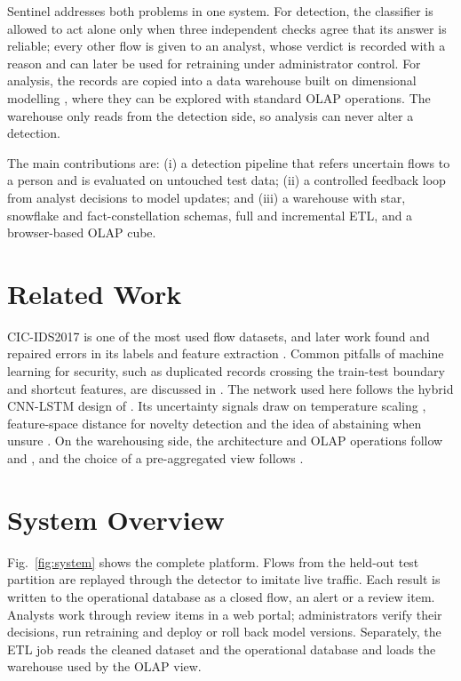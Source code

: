 \documentclass[conference]{IEEEtran}
\begin{document}
Sentinel addresses both problems in one system. For detection, the classifier is allowed to act
alone only when three independent checks agree that its answer is reliable; every other flow is
given to an analyst, whose verdict is recorded with a reason and can later be used for retraining
under administrator control. For analysis, the records are copied into a data warehouse built on
dimensional modelling \cite{inmon2005building,kimball2013toolkit}, where they can be explored with
standard OLAP operations. The warehouse only reads from the detection side, so analysis can never
alter a detection.

The main contributions are: (i) a detection pipeline that refers uncertain flows to a person and
is evaluated on untouched test data; (ii) a controlled feedback loop from analyst decisions to
model updates; and (iii) a warehouse with star, snowflake and fact-constellation schemas, full and
incremental ETL, and a browser-based OLAP cube.

\section{Related Work}
CIC-IDS2017 \cite{sharafaldin2018toward} is one of the most used flow datasets, and later work
found and repaired errors in its labels and feature extraction
\cite{engelen2021troubleshooting,liu2022error}. Common pitfalls of machine learning for security,
such as duplicated records crossing the train-test boundary and shortcut features, are discussed in
\cite{arp2022dos,sommer2010outside}. The network used here follows the hybrid CNN-LSTM design of
\cite{refpaper2025}. Its uncertainty signals draw on temperature scaling \cite{guo2017calibration},
feature-space distance for novelty detection \cite{lee2018simple} and the idea of abstaining when
unsure \cite{geifman2017selective}. On the warehousing side, the architecture and OLAP operations
follow \cite{chaudhuri1997overview} and \cite{gray1997datacube}, and the choice of a
pre-aggregated view follows \cite{harinarayan1996implementing}.

\section{System Overview}
Fig.~\ref{fig:system} shows the complete platform. Flows from the held-out test partition are
replayed through the detector to imitate live traffic. Each result is written to the operational
database as a closed flow, an alert or a review item. Analysts work through review items in a
web portal; administrators verify their decisions, run retraining and deploy or roll back model
versions. Separately, the ETL job reads the cleaned dataset and the operational database and loads
the warehouse used by the OLAP view.
\end{document}
